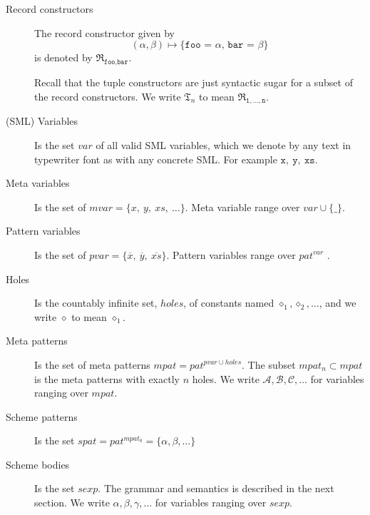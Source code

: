 \begin{description}
\item[Record constructors] The record constructor given by
  \[
  (\alpha, \beta) \mapsto \texttt{\{foo = $\alpha$, bar = $\beta$\}}
  \]
  is denoted by $\mathfrak{R}_{\texttt{foo},\texttt{bar}}$.

  Recall that the tuple constructors are just syntactic sugar for a subset of
  the record constructors. We write $\mathfrak{T}_n$ to mean
  $\mathfrak{R}_{\texttt{1},\ldots,\texttt{n}}$.


\item[(SML) Variables] Is the set $var$ of all valid SML variables, which we
  denote by any text in typewriter font as with any concrete SML. For example
  $\mathtt{x},\ \mathtt{y},\ \mathtt{xs}$.



\item[Meta variables] Is the set of $mvar = \{x,\ y,\ xs,\ \ldots \}$. Meta
  variable range over $var \cup \{\texttt{_}\}$.


\item[Pattern variables] Is the set of $pvar = \{ \overline{x},\ \overline{y},\
  \overline{xs} \}$. Pattern variables range over $pat^{var}$ .


\item[Holes] Is the countably infinite set, $holes$, of constants named
  $\diamond_1, \diamond_2, \ldots$, and we write $\diamond$ to mean
  $\diamond_1$.


\item[Meta patterns] Is the set of meta patterns $mpat = pat^{pvar \cup
    holes}$. The subset $mpat_n \subset mpat$ is the meta patterns with exactly
  $n$ holes. We write $\mathcal{A},\mathcal{B}, \mathcal{C}, \ldots$ for
  variables ranging over $mpat$.


\item[Scheme patterns] Is the set $spat = pat^{mpat_0} = \{\alpha, \beta, \ldots
  \}$


\item[Scheme bodies] Is the set $sexp$. The grammar and semantics is described
  in the next section. We write $\alpha, \beta, \gamma, \ldots$ for variables
  ranging over $sexp$.



\end{description}
